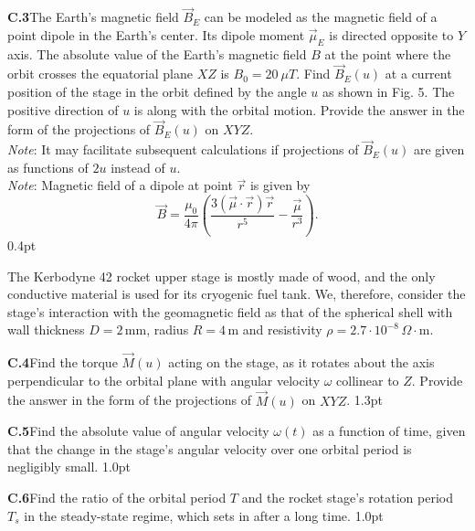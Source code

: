 \textbf{C.3}\quad The Earth's magnetic field $\vec{B}_E$ can be modeled as the
magnetic field of a point dipole in the Earth's center. Its dipole moment
$\vec{\mu}_E$ is directed opposite to $Y$ axis. The absolute value of the
Earth's magnetic field $B$ at the point where the orbit crosses the equatorial
plane $XZ$ is $B_0 = 20\ \mu T$. Find $\vec{B}_E(u)$ at a current position of
the stage in the orbit defined by the angle $u$ as shown in Fig. 5. The
positive direction of $u$ is along with the orbital motion. Provide the answer
in the form of the projections of $\vec{B}_E(u)$ on $XYZ$.\\
\textit{Note}: It may facilitate subsequent calculations if projections of
$\vec{B}_E(u)$ are given as functions of $2u$ instead of $u$.\\
\textit{Note}: Magnetic field of a dipole at point $\vec{r}$ is given by
\begin{equation}
\vec{B} = \frac{\mu_0}{4\pi}\left(\frac{3(\vec{\mu}\cdot\vec{r})\vec{r}}{r^5} - \frac{\vec{\mu}}{r^3}\right).
\tag{1}
\end{equation}
\hfill 0.4pt

The \textquotedbl Kerbodyne 42\textquotedbl{} rocket upper stage is mostly made of wood, and the only
conductive material is used for its cryogenic fuel tank. We, therefore,
consider the stage’s interaction with the geomagnetic field as that of the
spherical shell with wall thickness $D = 2\,\mathrm{mm}$, radius
$R = 4\,\mathrm{m}$ and resistivity
$\rho = 2.7 \cdot 10^{-8}\,\Omega \cdot \mathrm{m}$.

\textbf{C.4}\quad Find the torque $\vec{M}(u)$ acting on the stage, as it
rotates about the axis perpendicular to the orbital plane with angular velocity
$\omega$ collinear to $Z$. Provide the answer in the form of the projections of
$\vec{M}(u)$ on $XYZ$. \hfill 1.3pt

\textbf{C.5}\quad Find the absolute value of angular velocity $\omega(t)$ as a
function of time, given that the change in the stage’s angular velocity over
one orbital period is negligibly small. \hfill 1.0pt

\textbf{C.6}\quad Find the ratio of the orbital period $T$ and the rocket
stage’s rotation period $T_s$ in the steady-state regime, which sets in after a
long time. \hfill 1.0pt
